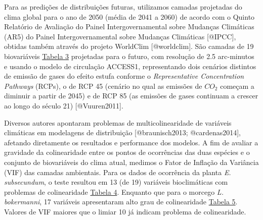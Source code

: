\documentclass[
  11pt,
]{article}
\begin{document}
Para as predições de distribuições futuras, utilizamos camadas
projetadas do clima global para o ano de 2050 (média de 2041 a 2060) de
acordo com o Quinto Relatório de Avaliação do Painel Intergovernamental
sobre Mudanças Climáticas (AR5) do Painel Intergovernamental sobre
Mudanças Climáticas {[}@IPCC{]}, obtidas também através do projeto
WorldClim {[}@worldclim{]}. São camadas de 19 biovariáveis
\protect\hyperlink{apuxeandice}{Tabela 3} projetadas para o futuro, com
resolução de 2.5 arc-minutos e usando o modelo de circulação ACCESS1,
representando dois cenários distintos de emissão de gases do efeito
estufa conforme o \emph{Representative Concentration Pathways} (RCPs), o
de RCP 45 (cenário no qual as emissões de \(CO_2\) começam a diminuir a
partir de 2045) e de RCP 85 (as emissões de gases continuam a crescer ao
longo do século 21) {[}@Vuuren2011{]}.

Diversos autores apontaram problemas de multicolinearidade de variáveis
climáticas em modelagens de distribuição {[}@braunisch2013;
@cardenas2014{]}, afetando diretamente os resultados e performance dos
modelos. A fim de avaliar a gravidade da colinearidade entre os pontos
de ocorrências das duas espécies e o conjunto de biovariáveis do clima
atual, medimos o Fator de Inflação da Variância (VIF) das camadas
ambientais. Para os dados de ocorrência da planta \emph{E. subsecundum},
o teste resultou em 13 (de 19) variáveis bioclimáticas com problemas de
colinearidade \protect\hyperlink{apuxeandice}{Tabela 4}. Enquanto que
para o morcego \emph{L. bokermanni}, 17 variáveis apresentaram alto grau
de colinearidade \protect\hyperlink{apuxeandice}{Tabela 5}. Valores de
VIF maiores que o limiar 10 já indicam problema de colinearidade.
\end{document}

